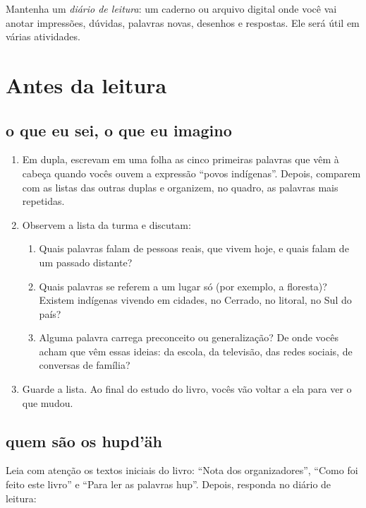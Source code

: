 Mantenha um \textit{diário de leitura}: um caderno ou arquivo digital
onde você vai anotar impressões, dúvidas, palavras novas, desenhos e
respostas. Ele será útil em várias atividades.

\chapter{Antes da leitura}

\section{o que eu sei, o que eu imagino}

\begin{enumerate}[label=\arabic*.]
\item Em dupla, escrevam em uma folha as cinco primeiras palavras que
vêm à cabeça quando vocês ouvem a expressão ``povos indígenas''. Depois,
comparem com as listas das outras duplas e organizem, no quadro, as
palavras mais repetidas.
\item Observem a lista da turma e discutam:
\begin{enumerate}[label=\alph*)]
\item Quais palavras falam de pessoas reais, que vivem hoje, e quais
falam de um passado distante?
\item Quais palavras se referem a um lugar só (por exemplo, a floresta)?
Existem indígenas vivendo em cidades, no Cerrado, no litoral, no Sul do
país?
\item Alguma palavra carrega preconceito ou generalização? De onde vocês
acham que vêm essas ideias: da escola, da televisão, das redes sociais,
de conversas de família?
\end{enumerate}
\item Guarde a lista. Ao final do estudo do livro, vocês vão voltar a ela
para ver o que mudou.
\end{enumerate}

\section{quem são os hupd'äh}

Leia com atenção os textos iniciais do livro: ``Nota dos
organizadores'', ``Como foi feito este livro'' e ``Para ler as palavras
hup''. Depois, responda no diário de leitura:

